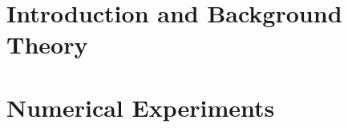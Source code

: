 
\addtolength{\evensidemargin}{-12mm}

%
%
\part[Introduction and Background Theory]{Introduction and Background Theory}
\label{part:introAndBackgroundTheory}




\part[Numerical Experiments]{Numerical Experiments}
\label{part:body}




%
%


% 
